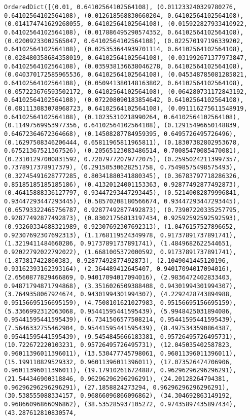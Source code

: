 \documentclass[11pt]{article}
\begin{document}
    \begin{Verbatim}[commandchars=\\\{\}]
OrderedDict([(0.01, 0.64102564102564108), (0.011233240329780276, 0.64102564102564108), (0.012618568830660204, 0.64102564102564108), (0.014174741629268055, 0.64102564102564108), (0.015922827933410922, 0.64102564102564108), (0.017886495290574352, 0.64102564102564108), (0.02009233002565047, 0.64102564102564108), (0.022570197196339202, 0.64102564102564108), (0.025353644939701114, 0.64102564102564108), (0.028480358684358019, 0.64102564102564108), (0.031992671377973847, 0.64102564102564108), (0.035938136638046278, 0.64102564102564108), (0.040370172585965536, 0.64102564102564108), (0.045348785081285821, 0.64102564102564108), (0.050941380148163802, 0.64102564102564108), (0.057223676593502172, 0.64102564102564108), (0.064280731172843192, 0.64102564102564108), (0.072208090183854642, 0.64102564102564108), (0.081113083078968723, 0.64102564102564108), (0.091116275611548919, 0.64102564102564108), (0.10235310218990264, 0.64102564102564108), (0.11497569953977356, 0.64102564102564108), (0.12915496650148839, 0.64672364672364668), (0.14508287784959395, 0.6495726495726496), (0.16297508346206444, 0.65811965811965811), (0.18307382802953678, 0.67521367521367526), (0.20565123083486514, 0.70085470085470081), (0.23101297000831592, 0.72079772079772075), (0.25950242113997357, 0.7378917378917379), (0.29150530628251758, 0.75498575498575493), (0.32745491628777285, 0.80341880341880345), (0.36783797718286326, 0.85185185185185186), (0.41320124001153363, 0.92877492877492873), (0.46415888336127797, 0.93447293447293445), (0.52140082879996841, 0.93447293447293445), (0.58570208180566674, 0.93447293447293445), (0.65793322465756787, 0.92877492877492873), (0.73907220335257795, 0.92877492877492873), (0.83021756813197434, 0.92592592592592593), (0.93260334688321989, 0.92307692307692313), (1.0476157527896652, 0.92307692307692313), (1.1768119524349978, 0.91737891737891741), (1.3219411484660286, 0.91737891737891741), (1.4849682622544651, 0.92022792022792022), (1.6681005372000592, 0.91737891737891741), (1.873817422860383, 0.92877492877492873), (2.1049041445120196, 0.93162393162393164), (2.364489412645407, 0.94017094017094016), (2.6560877829466869, 0.94017094017094016), (2.9836472402833403, 0.94871794871794868), (3.3516026509388408, 0.94301994301994307), (3.7649358067924674, 0.94301994301994307), (4.2292428743894988, 0.95156695156695159), (4.7508101621027983, 0.95156695156695159), (5.3366992312063068, 0.95441595441595439), (5.9948425031894086, 0.95441595441595439), (6.7341506577508214, 0.95441595441595439), (7.5646332755462904, 0.95441595441595439), (8.4975343590864387, 0.95441595441595439), (9.5454845666183381, 0.95726495726495731), (10.722672220103231, 0.95726495726495731), (12.045035402587823, 0.96011396011396011), (13.530477745798061, 0.96011396011396011), (15.199110829529332, 0.96011396011396011), (17.073526474706906, 0.96011396011396011), (19.179102616724887, 0.96296296296296291), (21.544346900318846, 0.96296296296296291), (24.20128264794381, 0.96296296296296291), (27.1858824273294, 0.96296296296296291), (30.538555088334157, 0.96866096866096862), (34.304692863149192, 0.96866096866096862), (38.535285937105272, 0.97435897435897434), (43.287612810830574, 
\end{Verbatim}
\end{document}
